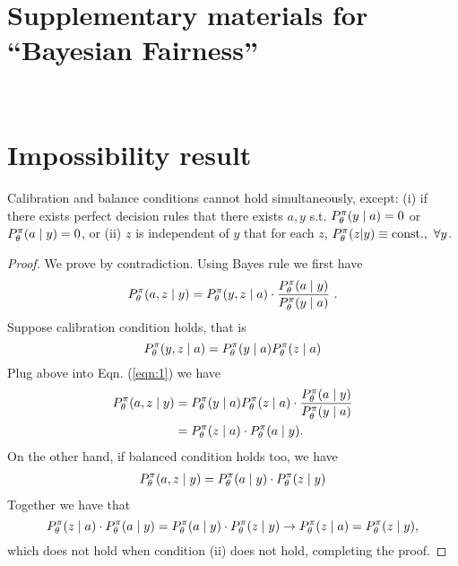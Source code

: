 
\newpage
\section*{\LARGE Supplementary materials for ``Bayesian Fairness''}

\setcounter{section}{0}

~\\

\section{Impossibility result}

\begin{theorem}\label{thm:impossible}
Calibration and balance conditions cannot hold simultaneously, except: (i) if there exists perfect decision rules that there exists $a,y$ s.t. $ P_\theta^\pi(y\mid a) = 0 $ or $ P_\theta^\pi(a\mid y) = 0 $, or (ii) $z$ is independent of $y$ that for each $z$, $ P_\theta^\pi(z|y) \equiv \text{const.},~\forall y$.
\end{theorem}
\begin{proof}
We prove by contradiction. Using Bayes rule we first have
\begin{align}
    P_\theta^\pi(a, z \mid y) =     P_\theta^\pi(y, z \mid a) \cdot \frac{P_\theta^\pi(a \mid y)}{P_\theta^\pi(y \mid a)} ~.\label{eqn:1}
\end{align}
Suppose calibration condition holds, that is 
\[
P_\theta^\pi(y, z \mid a) = P_\theta^\pi(y \mid a) P_\theta^\pi(z \mid a)
\]
Plug above into Eqn. (\ref{eqn:1}) we have 
\begin{align*}
    P_\theta^\pi(a, z \mid y) &=    P_\theta^\pi(y \mid a) P_\theta^\pi(z \mid a) \cdot \frac{P_\theta^\pi(a \mid y)}{P_\theta^\pi(y \mid a)} \\
    &=P_\theta^\pi(z \mid a) \cdot P_\theta^\pi(a \mid y).
    \end{align*}
    On the other hand, if balanced condition holds too, we have
    \begin{align*}
    P_\theta^\pi(a, z \mid y) =P_\theta^\pi(a \mid y) \cdot P_\theta^\pi(z \mid y) 
    \end{align*}
    Together we have that 
    \[
  P_\theta^\pi(z \mid a) \cdot P_\theta^\pi(a \mid y)  = P_\theta^\pi(a \mid y) \cdot P_\theta^\pi(z \mid y) \rightarrow   P_\theta^\pi(z \mid a) =P_\theta^\pi(z \mid y),
    \]
    which does not hold when condition (ii) does not hold, completing the proof. 
\end{proof}

